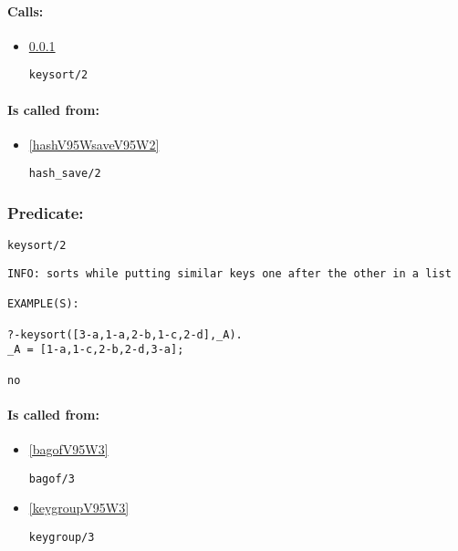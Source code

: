 \paragraph{Calls:} 
\begin{itemize}
\item \ref{keysortV95W2} 
\begin{verbatim}
keysort/2
\end{verbatim}

\end{itemize}
\paragraph{Is called from:} 
\begin{itemize}
\item \ref{hashV95WsaveV95W2} 
\begin{verbatim}
hash_save/2
\end{verbatim}

\end{itemize}

\subsubsection{Predicate:} \label{keysortV95W2}

\begin{verbatim}
keysort/2
\end{verbatim}

{\small \begin{verbatim}
INFO: sorts while putting similar keys one after the other in a list

EXAMPLE(S):

?-keysort([3-a,1-a,2-b,1-c,2-d],_A).
_A = [1-a,1-c,2-b,2-d,3-a];

no

\end{verbatim}}
\paragraph{Is called from:} 
\begin{itemize}
\item \ref{bagofV95W3} 
\begin{verbatim}
bagof/3
\end{verbatim}

\item \ref{keygroupV95W3} 
\begin{verbatim}
keygroup/3
\end{verbatim}

\end{itemize}

